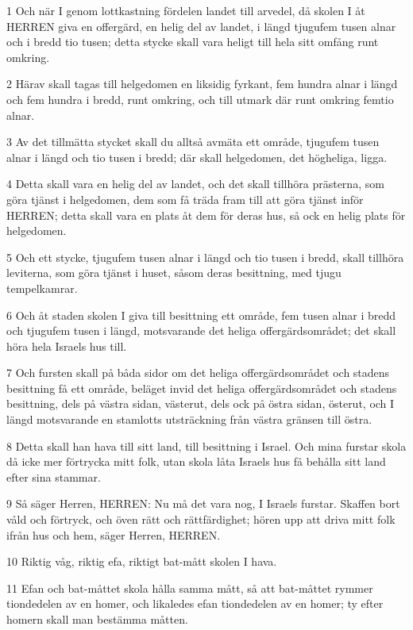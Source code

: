 \par 1 Och när I genom lottkastning fördelen landet till arvedel, då skolen I åt HERREN giva en offergärd, en helig del av landet, i längd tjugufem tusen alnar och i bredd tio tusen; detta stycke skall vara heligt till hela sitt omfång runt omkring.
\par 2 Härav skall tagas till helgedomen en liksidig fyrkant, fem hundra alnar i längd och fem hundra i bredd, runt omkring, och till utmark där runt omkring femtio alnar.
\par 3 Av det tillmätta stycket skall du alltså avmäta ett område, tjugufem tusen alnar i längd och tio tusen i bredd; där skall helgedomen, det högheliga, ligga.
\par 4 Detta skall vara en helig del av landet, och det skall tillhöra prästerna, som göra tjänst i helgedomen, dem som få träda fram till att göra tjänst inför HERREN; detta skall vara en plats åt dem för deras hus, så ock en helig plats för helgedomen.
\par 5 Och ett stycke, tjugufem tusen alnar i längd och tio tusen i bredd, skall tillhöra leviterna, som göra tjänst i huset, såsom deras besittning, med tjugu tempelkamrar.
\par 6 Och åt staden skolen I giva till besittning ett område, fem tusen alnar i bredd och tjugufem tusen i längd, motsvarande det heliga offergärdsområdet; det skall höra hela Israels hus till.
\par 7 Och fursten skall på båda sidor om det heliga offergärdsområdet och stadens besittning få ett område, beläget invid det heliga offergärdsområdet och stadens besittning, dels på västra sidan, västerut, dels ock på östra sidan, österut, och I längd motsvarande en stamlotts utsträckning från västra gränsen till östra.
\par 8 Detta skall han hava till sitt land, till besittning i Israel. Och mina furstar skola då icke mer förtrycka mitt folk, utan skola låta Israels hus få behålla sitt land efter sina stammar.
\par 9 Så säger Herren, HERREN: Nu må det vara nog, I Israels furstar. Skaffen bort våld och förtryck, och öven rätt och rättfärdighet; hören upp att driva mitt folk ifrån hus och hem, säger Herren, HERREN.
\par 10 Riktig våg, riktig efa, riktigt bat-mått skolen I hava.
\par 11 Efan och bat-måttet skola hålla samma mått, så att bat-måttet rymmer tiondedelen av en homer, och likaledes efan tiondedelen av en homer; ty efter homern skall man bestämma måtten.
